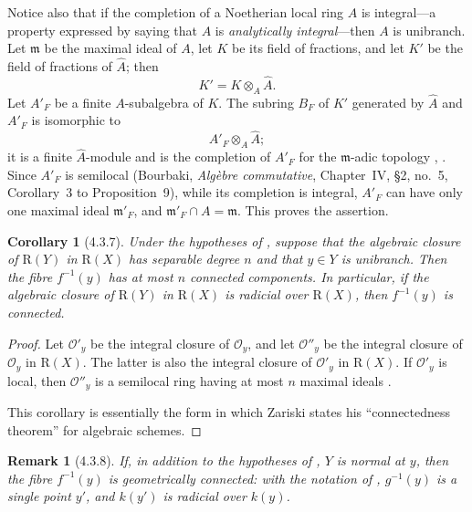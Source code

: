 \documentclass[oneside]{amsart}
\theoremstyle{ega-env-style}
\theoremstyle{ega-thm-env-style}
\newtheorem*{corollary}{Corollary}
\theoremstyle{ega-defn-env-style}
\newtheorem*{remark}{Remark}
\def\mathcal{\mathscr}
\def\sh{\mathcal}                   %
\def\kres{k}                        %
\let\EGAOriginalLabel\label
\renewcommand{\label}[1]{\phantomsection\EGAOriginalLabel{#1}}
\begin{document}
Notice also that if the completion of a Noetherian local ring $A$ is
integral---a property expressed by saying that $A$ is
\emph{analytically integral}---then $A$ is unibranch.  Let
$\mathfrak{m}$ be the maximal ideal of $A$, let $K$ be its field of
fractions, and let $K'$ be the field of fractions of $\widehat{A}$;
then
\[
  K'=K\otimes_A\widehat{A}.
\]
Let $A'_F$ be a finite $A$-subalgebra of $K$.  The subring $B_F$ of
$K'$ generated by $\widehat{A}$ and $A'_F$ is isomorphic to
\[
  A'_F\otimes_A\widehat{A};
\]
it is a finite $\widehat{A}$-module and is the completion of $A'_F$
for the $\mathfrak{m}$-adic topology
, .  Since $A'_F$ is semilocal
(Bourbaki, \emph{Alg\`ebre commutative}, Chapter~IV, \S2, no.~5,
Corollary~3 to Proposition~9), while its completion is integral,
$A'_F$ can have only one maximal ideal $\mathfrak{m}'_F$, and
$\mathfrak{m}'_F\cap A=\mathfrak{m}$.  This proves the assertion.

\begin{corollary}[4.3.7]
\label{III.4.3.7}
Under the hypotheses of , suppose that the algebraic
closure of $\mathrm{R}(Y)$ in $\mathrm{R}(X)$ has separable degree $n$ and that
$y\in Y$ is unibranch.  Then the fibre $f^{-1}(y)$ has at most $n$
connected components.  In particular, if the algebraic closure of
$\mathrm{R}(Y)$ in $\mathrm{R}(X)$ is radicial over $\mathrm{R}(X)$, then $f^{-1}(y)$ is
connected.
\end{corollary}

\begin{proof}
Let $\sh{O}'_y$ be the integral closure of $\sh{O}_y$, and let
$\sh{O}''_y$ be the integral closure of $\sh{O}_y$ in $\mathrm{R}(X)$.
The latter is also the integral closure of $\sh{O}'_y$ in $\mathrm{R}(X)$.
If $\sh{O}'_y$ is local, then $\sh{O}''_y$ is a semilocal ring
having at most $n$ maximal ideals
\cite[vol.~I, p.~289, Theorem~22]{I-13}.

This corollary is essentially the form in which Zariski states his
``connectedness theorem'' for algebraic schemes.
\end{proof}

\begin{remark}[4.3.8]
\label{III.4.3.8}
If, in addition to the hypotheses of , $Y$ is
normal at $y$, then the fibre $f^{-1}(y)$ is geometrically
connected: with the notation of , $g^{-1}(y)$ is a
single point $y'$, and $\kres(y')$ is radicial over $\kres(y)$.
\end{remark}
\end{document}
